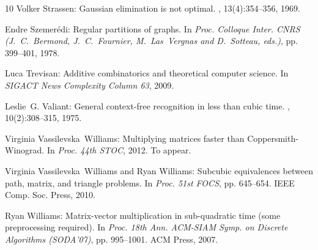 \begin{thebibliography}{10}
{\sc Volker Strassen}: {G}aussian elimination is not optimal.
, 13(4):354--356, 1969.
\newblock [\epfmtdoi{10.1007/BF02165411}]

{\sc Endre Szemer\'edi}: Regular partitions of graphs.
\newblock In {\em Proc. Colloque Inter. CNRS (J.~C.~Bermond, J.~C.~Fournier,
  M.~Las~Vergnas and D.~Sotteau, eds.)}, pp. 399--401, 1978.

{\sc Luca Trevisan}: Additive combinatorics and theoretical computer science.
\newblock In {\em SIGACT News Complexity Column 63}, 2009.

{\sc Leslie~G. Valiant}: General context-free recognition in less than cubic
  time.
, 10(2):308--315, 1975.
\newblock [\epfmtdoi{10.1016/S0022-0000(75)80046-8}]

{\sc Virginia Vassilevska~Williams}: Multiplying matrices faster than
  {C}oppersmith-{W}inograd.
\newblock In {\em Proc. 44th STOC}, 2012.
\newblock To appear.

{\sc Virginia Vassilevska~Williams and Ryan Williams}: Subcubic equivalences
  between path, matrix, and triangle problems.
\newblock In {\em Proc. 51st FOCS}, pp. 645--654. IEEE Comp. Soc. Press, 2010.

{\sc Ryan Williams}: Matrix-vector multiplication in sub-quadratic time (some
  preprocessing required).
\newblock In {\em Proc. 18th Ann. ACM-SIAM Symp. on Discrete Algorithms
  (SODA'07)}, pp. 995--1001. ACM Press, 2007.

\end{thebibliography}

